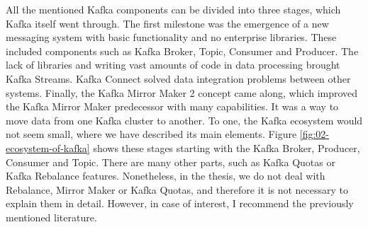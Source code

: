 All the mentioned Kafka components can be divided into three stages, which Kafka itself went through. The first milestone was the emergence of a new messaging system with basic functionality and no enterprise libraries. These included components such as Kafka Broker, Topic, Consumer and Producer. The lack of libraries and writing vast amounts of code in data processing brought Kafka Streams. Kafka Connect solved data integration problems between other systems. Finally, the Kafka Mirror Maker 2 concept came along, which improved the Kafka Mirror Maker predecessor with many capabilities. It was a way to move data from one Kafka cluster to another. To one, the Kafka ecosystem would not seem small, where we have described its main elements. Figure \ref{fig:02-ecosystem-of-kafka} shows these stages starting with the Kafka Broker, Producer, Consumer and Topic. There are many other parts, such as Kafka Quotas or Kafka Rebalance features. Nonetheless, in the thesis, we do not deal with Rebalance, Mirror Maker or Kafka Quotas, and therefore it is not necessary to explain them in detail. However, in case of interest, I recommend the previously mentioned literature.